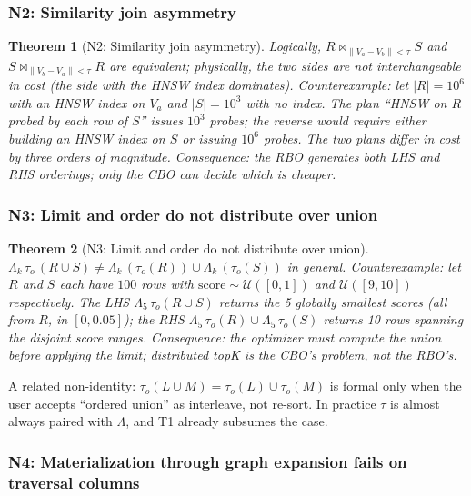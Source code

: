 \documentclass[sigconf]{acmart}
\theoremstyle{plain}
\newtheorem{theorem}{Theorem}
\theoremstyle{definition}
\theoremstyle{remark}
\begin{document}
\subsubsection{N2: Similarity join asymmetry}

\begin{theorem}[N2: Similarity join asymmetry]\label{thm:n2}
Logically, $R \bowtie_{\lVert V_a-V_b\rVert<\tau} S$ and
$S \bowtie_{\lVert V_b-V_a\rVert<\tau} R$ are equivalent;
physically, the two sides are not interchangeable in cost (the
side with the HNSW index dominates). \emph{Counterexample:}
let $|R| = 10^6$ with an HNSW index on $V_a$ and $|S| = 10^3$
with no index. The plan ``HNSW on $R$ probed by each row of
$S$'' issues $10^3$ probes; the reverse would require either
building an HNSW index on $S$ or issuing $10^6$ probes. The two
plans differ in cost by three orders of magnitude.
\emph{Consequence:} the RBO generates both LHS and RHS orderings;
only the CBO can decide which is cheaper.
\end{theorem}

\subsubsection{N3: Limit and order do not distribute over union}

\begin{theorem}[N3: Limit and order do not distribute over union]\label{thm:n3}
$\Lambda_k\, \tau_o\, (R \cup S) \neq \Lambda_k\, (\tau_o(R))
\cup \Lambda_k\, (\tau_o(S))$ in general.
\emph{Counterexample:} let $R$ and $S$ each have $100$ rows with
$\mathrm{score} \sim \mathcal{U}([0,1])$ and $\mathcal{U}([9,10])$
respectively. The LHS $\Lambda_5\,\tau_o(R\cup S)$ returns the
5 globally smallest scores (all from $R$, in $[0, 0.05]$); the
RHS $\Lambda_5\,\tau_o(R) \cup \Lambda_5\,\tau_o(S)$ returns 10
rows spanning the disjoint score ranges. \emph{Consequence:} the
optimizer must compute the union before applying the limit;
distributed topK is the CBO's problem, not the RBO's.
\end{theorem}

A related non-identity: $\tau_o(L \cup M) = \tau_o(L) \cup
\tau_o(M)$ is formal only when the user accepts ``ordered
union'' as interleave, not re-sort. In practice $\tau$ is
almost always paired with $\Lambda$, and T1 already subsumes
the case.

\subsubsection{N4: Materialization through graph expansion fails on traversal columns}
\end{document}
